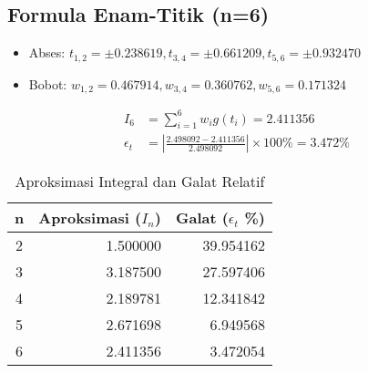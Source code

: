 \documentclass[conference]{IEEEtran}
\begin{document}
\subsection{Formula Enam-Titik (n=6)}
\begin{itemize}
    \item Abses: $t_{1,2}=\pm0.238619, t_{3,4}=\pm0.661209, t_{5,6}=\pm0.932470$
    \item Bobot: $w_{1,2}=0.467914, w_{3,4}=0.360762, w_{5,6}=0.171324$
\end{itemize}
\begin{align*}
    I_6 &= \sum_{i=1}^{6} w_i g(t_i) = \mathbf{2.411356} \\
    \epsilon_t &= \left| \frac{2.498092 - 2.411356}{2.498092} \right| \times 100\% = \mathbf{3.472\%}
\end{align*}

\begin{table}[htbp]
\centering
\caption{Aproksimasi Integral dan Galat Relatif}
\label{tab:hasil_aproksimasi_ringkas}
\renewcommand{\arraystretch}{1.2}
\begin{tabular}{|c|r|r|}
\hline
\textbf{n} & \textbf{Aproksimasi ($I_n$)} & \textbf{Galat ($\epsilon_t$ \%)} \\
\hline
2 & 1.500000 & 39.954162 \\
3 & 3.187500 & 27.597406 \\
4 & 2.189781 & 12.341842 \\
5 & 2.671698 & 6.949568  \\
6 & 2.411356 & 3.472054  \\
\hline
\end{tabular}
\end{table}
\end{document}
